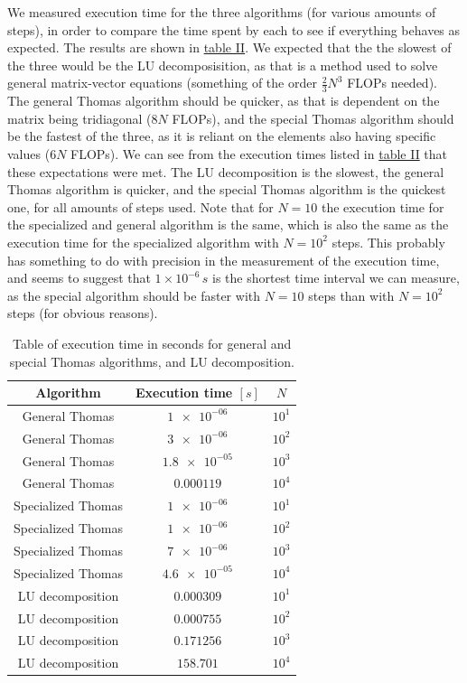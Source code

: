 \documentclass[english,notitlepage,reprint,nofootinbib]{revtex4-1}  %
\begin{document}
We measured execution time for the three algorithms (for various amounts of steps), in order to compare the time spent by each to see if everything behaves as expected. The results are shown in \hyperref[table:iv:c:1]{table II}. We expected that the the slowest of the three would be the LU decomposisition, as that is a method used to solve general matrix-vector equations (something of the order $\frac{2}{3}N^3$ FLOPs needed). The general Thomas algorithm should be quicker, as that is dependent on the matrix being tridiagonal ($8N$ FLOPs), and the special Thomas algorithm should be the fastest of the three, as it is reliant on the elements also having specific values ($6N$ FLOPs). We can see from the execution times listed in \hyperref[table:iv:c:1]{table II} that these expectations were met. The LU decomposition is the slowest, the general Thomas algorithm is quicker, and the special Thomas algorithm is the quickest one, for all amounts of steps used. Note that for $N=10$ the execution time for the specialized and general algorithm is the same, which is also the same as the execution time for the specialized algorithm with $N=10^2$ steps. This probably has something to do with precision in the measurement of the execution time, and seems to suggest that $1 \times 10^{-6}\, s$ is the shortest time interval we can measure, as the special algorithm should be faster with $N=10$ steps than with $N=10^2$ steps (for obvious reasons).


\begin{table}[H]
	\centering
	\label{table:iv:c:1}
	\caption{Table of execution time in seconds for general and special Thomas algorithms, and LU decomposition.}

	\begin{tabular}{|c|c|c|}
		\hline
		Algorithm & Execution time \([s]\) & \(N\) \\\hline
		General Thomas & \(\num{1e-06}\) & \(10^{1}\) \\
		General Thomas & \(\num{3e-06}\) & \(10^{2}\) \\
		General Thomas & \(\num{1.8e-05}\) & \(10^{3}\) \\
		General Thomas & \(\num{0.000119}\) & \(10^{4}\) \\\hline
		Specialized Thomas & \(\num{1e-06}\) & \(10^{1}\) \\
		Specialized Thomas & \(\num{1e-06}\) & \(10^{2}\) \\
		Specialized Thomas & \(\num{7e-06}\) & \(10^{3}\) \\
		Specialized Thomas & \(\num{4.6e-05}\) & \(10^{4}\) \\\hline
		LU decomposition & \(\num{0.000309}\) & \(10^{1}\) \\
		LU decomposition & \(\num{0.000755}\) & \(10^{2}\) \\
		LU decomposition & \(\num{0.171256}\) & \(10^{3}\) \\
		LU decomposition & \(\num{158.701}\) & \(10^{4}\) \\\hline
	\end{tabular}

\end{table}
\end{document}
